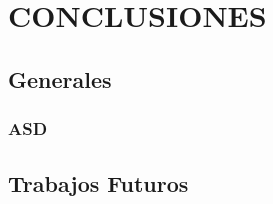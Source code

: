
\chapter{CONCLUSIONES} %

\label{C7} %



\section{Generales}


\subsection{ASD}


\section{Trabajos Futuros}
